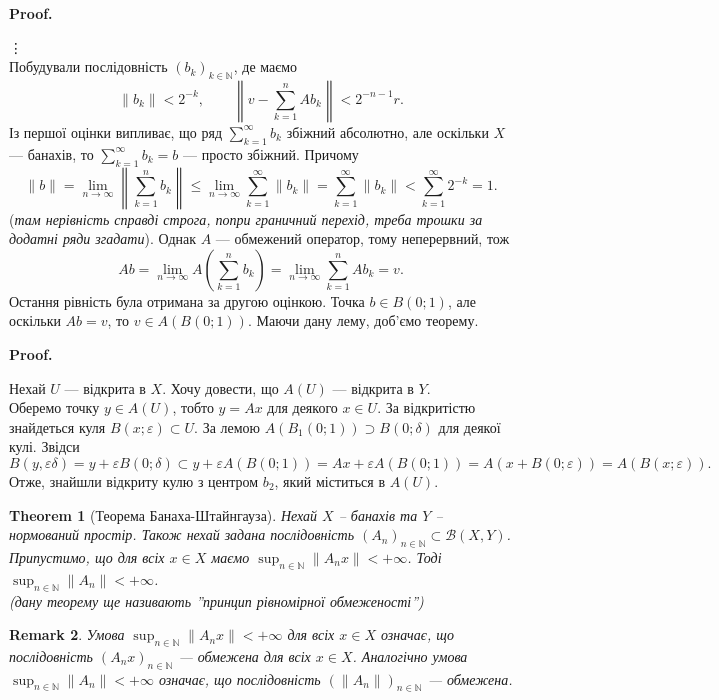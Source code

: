 \documentclass[a4paper, 10pt]{article}
\makeatletter
\theoremstyle{theoremdd}
\newtheorem{theorem}{Theorem}[subsection]
\theoremstyle{theoremdd}
\theoremstyle{theoremdd}
\theoremstyle{theoremdd}
\theoremstyle{theoremdd}
\theoremstyle{theoremdd}
\newtheorem{remark}[theorem]{Remark}
\theoremstyle{theoremdd}
\theoremstyle{theoremdd}
\renewenvironment{proof}[1][Proof.\\]{\par
\pushQED{\hfill \qed}%
\normalfont \topsep6\p@\@plus6\p@\relax
\trivlist
\item\relax
{\bfseries
#1\@addpunct{.}}\hspace\labelsep\ignorespaces
}{%
\popQED\endtrivlist\@endpefalse
}
\makeatother
\begin{document}
\begin{proof}
\vdots \\
Побудували послідовність $(b_k)_{k \in \mathbb{N}}$, де маємо
\[
\| b_k\| < 2^{-k}, \qquad \left\| v - \sum_{k=1}^n A b_k \right\| < 2^{-n-1} r.
\]
Із першої оцінки випливає, що ряд $\displaystyle\sum_{k=1}^\infty b_k$ збіжний абсолютно, але оскільки $X$ --- банахів, то $\displaystyle\sum_{k=1}^\infty b_k = b$ --- просто збіжний. Причому
\[
\| b \| = \lim_{n \to \infty} \left\| \sum_{k=1}^n b_k \right\| \leq \lim_{n \to \infty} \sum_{k=1}^\infty \|b_k\| = \sum_{k=1}^\infty \|b_k\| < \sum_{k=1}^\infty 2^{-k} = 1.
\]
(\textit{там нерівність справді строга, попри граничний перехід, треба трошки за додатні ряди згадати}). Однак $A$ --- обмежений оператор, тому неперервний, тож
\[
Ab = \lim_{n \to \infty} A\left( \sum_{k=1}^n b_k \right) = \lim_{n \to \infty} \sum_{k=1}^n Ab_k = v.
\] 
Остання рівність була отримана за другою оцінкою. Точка $b \in B(0;1)$, але оскільки $Ab = v$, то $v \in A(B(0;1))$.
\end{proof}
\noindent
Маючи дану лему, доб'ємо теорему.

\begin{proof}
Нехай $U$ --- відкрита в $X$. Хочу довести, що $A(U)$ --- відкрита в $Y$.\\
Оберемо точку $y \in A(U)$, тобто $y = Ax$ для деякого $x \in U$. За відкритістю знайдеться куля $B(x;\varepsilon) \subset U$. За лемою $A(B_1(0;1)) \supset B(0;\delta)$ для деякої кулі. Звідси
\[
B(y, \varepsilon \delta) = y + \varepsilon B(0;\delta) \subset y + \varepsilon A(B(0;1)) = Ax + \varepsilon A(B(0;1)) = A(x + B(0;\varepsilon)) = A(B(x;\varepsilon)).
\]
Отже, знайшли відкриту кулю з центром $b_2$, який міститься в $A(U)$.
\end{proof}

\begin{theorem}[Теорема Банаха-Штайнгауза]
Нехай $X$ -- банахів та $Y$ -- нормований простір. Також нехай задана послідовність $(A_n)_{n \in \mathbb{N}} \subset \mathcal{B}(X,Y)$. Припустимо, що для всіх $x \in X$ маємо $\displaystyle\sup_{n \in \mathbb{N}} \| A_n x \| < +\infty$. Тоді $\displaystyle\sup_{n \in \mathbb{N}} \| A_n\| < +\infty$.\\
\textit{(дану теорему ще називають ''принцип рівномірної обмеженості'')}
\end{theorem}

\begin{remark}
Умова $\displaystyle\sup_{n \in \mathbb{N}} \| A_n x \| < +\infty$ для всіх $x \in X$ означає, що послідовність $(A_n x)_{n \in \mathbb{N}}$ --- обмежена для всіх $x \in X$. Аналогічно умова $\displaystyle\sup_{n \in \mathbb{N}} \| A_n\| < +\infty$ означає, що послідовність $(\|A_n\|)_{n \in \mathbb{N}}$ --- обмежена.
\end{remark}
\end{document}
